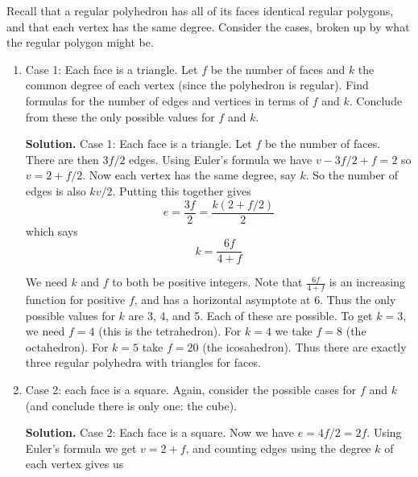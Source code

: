 \documentclass{book}
\begin{document}
\setcounter{project}{35}
\addtocounter{project}{-1}
\begin{activity}[]\label{activity-30}
\hypertarget{p-334}{}%
Recall that a regular polyhedron has all of its faces identical regular polygons, and that each vertex has the same degree. Consider the cases, broken up by what the regular polygon might be.%
\begin{enumerate}[font=\bfseries,label=(\alph*),ref=\alph*]
\item\label{task-46} \hypertarget{p-335}{}%
Case 1: Each face is a triangle.  Let \(f\) be the number of faces and \(k\) the common degree of each vertex (since the polyhedron is regular).  Find formulas for the number of edges and vertices in terms of \(f\) and \(k\).  Conclude from these the only possible values for \(f\) and \(k\).%
\par\smallskip%
\noindent\textbf{Solution.}\hypertarget{solution-29}{}\quad%
\hypertarget{p-336}{}%
Case 1: Each face is a triangle. Let \(f\) be the number of faces. There are then \(3f/2\) edges. Using Euler's formula we have \(v - 3f/2 + f = 2\) so \(v = 2 + f/2\). Now each vertex has the same degree, say \(k\). So the number of edges is also \(kv/2\). Putting this together gives%
\begin{equation*}
e = \frac{3f}{2} = \frac{k(2+f/2)}{2}
\end{equation*}
which says%
\begin{equation*}
k = \frac{6f}{4+f}
\end{equation*}
%
\par
\hypertarget{p-337}{}%
We need \(k\) and \(f\) to both be positive integers. Note that \(\frac{6f}{4+f}\) is an increasing function for positive \(f\), and has a horizontal asymptote at 6. Thus the only possible values for \(k\) are 3, 4, and 5. Each of these are possible. To get \(k = 3\), we need \(f = 4\) (this is the tetrahedron). For \(k = 4\) we take \(f = 8\) (the octahedron). For \(k = 5\) take \(f = 20\) (the icosahedron). Thus there are exactly three regular polyhedra with triangles for faces.%
\item\label{task-47} \hypertarget{p-338}{}%
Case 2: each face is a square.  Again, consider the possible cases for \(f\) and \(k\) (and conclude there is only one: the cube).%
\par\smallskip%
\noindent\textbf{Solution.}\hypertarget{solution-30}{}\quad%
\hypertarget{p-339}{}%
Case 2: Each face is a square. Now we have \(e = 4f/2 = 2f\). Using Euler's formula we get \(v = 2 + f\), and counting edges using the degree \(k\) of each vertex gives us%

\end{enumerate}
\end{activity}
\end{document}
